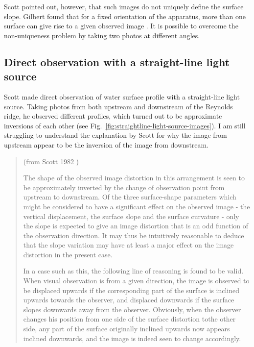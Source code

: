\documentclass[12pt]{article}
\begin{document}
Scott pointed out, however, that such images do not uniquely define the surface slope. Gilbert found that for a fixed orientation of the apparatus, more than one surface can give rise to a given observed image \cite{Gilbert1980}. It is possible to overcome the non-uniqueness problem by taking two photos at different angles.

\subsection{Direct observation with a straight-line light source}

Scott made direct observation of water surface profile with a straight-line light source. Taking photos from both upstream and downstream of the Reynolds ridge, he observed different profiles, which turned out to be approximate inversions of each other (see Fig.~\ref{fig:straightline-light-source-images}). I am still struggling to understand the explanation by Scott for why the image from upstream appear to be the inversion of the image from downstream.

\begin{quotation}
(from Scott 1982 \cite{Scott1982})

The shape of the observed image distortion in this arrangement is seen to be approximately inverted by the change of observation point from upstream to downstream. Of the three surface-shape parameters which might be considered to have a significant effect on the observed image - the vertical displacement, the surface slope and the surface curvature - only the slope is expected to give an image distortion that is an odd function of the observation direction. It may thus be intuitively reasonable to deduce that the slope variation may have at least a major effect on the image distortion in the present case. 

In a case such as this, the following line of reasoning is found to be valid. When visual observation is from a given direction, the image is observed to be displaced upwards if the corresponding part of the surface is inclined upwards towards the observer, and displaced downwards if the surface slopes downwards away from the observer. Obviously, when the observer changes his position from one side of the surface distortion tothe other side, any part of the surface originally inclined upwards now appears inclined downwards, and the image is indeed seen to change accordingly.
\end{quotation}
\end{document}
